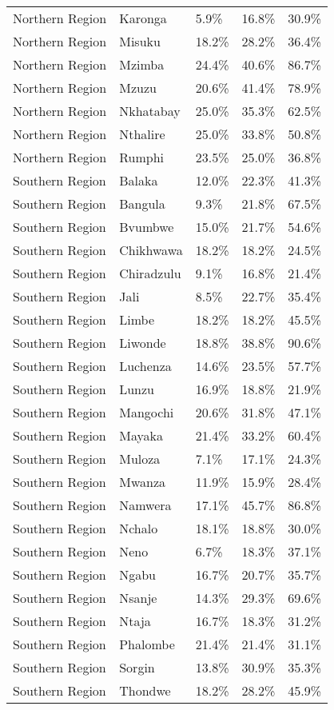 \begin{table}[ht]
\begin{tabular}{lllll}
  Northern Region & Karonga & 5.9\% & 16.8\% & 30.9\% \\ 
  Northern Region & Misuku & 18.2\% & 28.2\% & 36.4\% \\ 
  Northern Region & Mzimba & 24.4\% & 40.6\% & 86.7\% \\ 
  Northern Region & Mzuzu & 20.6\% & 41.4\% & 78.9\% \\ 
  Northern Region & Nkhatabay & 25.0\% & 35.3\% & 62.5\% \\ 
  Northern Region & Nthalire & 25.0\% & 33.8\% & 50.8\% \\ 
  Northern Region & Rumphi & 23.5\% & 25.0\% & 36.8\% \\ 
  Southern Region & Balaka & 12.0\% & 22.3\% & 41.3\% \\ 
  Southern Region & Bangula & 9.3\% & 21.8\% & 67.5\% \\ 
  Southern Region & Bvumbwe & 15.0\% & 21.7\% & 54.6\% \\ 
  Southern Region & Chikhwawa & 18.2\% & 18.2\% & 24.5\% \\ 
  Southern Region & Chiradzulu & 9.1\% & 16.8\% & 21.4\% \\ 
  Southern Region & Jali & 8.5\% & 22.7\% & 35.4\% \\ 
  Southern Region & Limbe & 18.2\% & 18.2\% & 45.5\% \\ 
  Southern Region & Liwonde & 18.8\% & 38.8\% & 90.6\% \\ 
  Southern Region & Luchenza & 14.6\% & 23.5\% & 57.7\% \\ 
  Southern Region & Lunzu & 16.9\% & 18.8\% & 21.9\% \\ 
  Southern Region & Mangochi & 20.6\% & 31.8\% & 47.1\% \\ 
  Southern Region & Mayaka & 21.4\% & 33.2\% & 60.4\% \\ 
  Southern Region & Muloza & 7.1\% & 17.1\% & 24.3\% \\ 
  Southern Region & Mwanza & 11.9\% & 15.9\% & 28.4\% \\ 
  Southern Region & Namwera & 17.1\% & 45.7\% & 86.8\% \\ 
  Southern Region & Nchalo & 18.1\% & 18.8\% & 30.0\% \\ 
  Southern Region & Neno & 6.7\% & 18.3\% & 37.1\% \\ 
  Southern Region & Ngabu & 16.7\% & 20.7\% & 35.7\% \\ 
  Southern Region & Nsanje & 14.3\% & 29.3\% & 69.6\% \\ 
  Southern Region & Ntaja & 16.7\% & 18.3\% & 31.2\% \\ 
  Southern Region & Phalombe & 21.4\% & 21.4\% & 31.1\% \\ 
  Southern Region & Sorgin & 13.8\% & 30.9\% & 35.3\% \\ 
  Southern Region & Thondwe & 18.2\% & 28.2\% & 45.9\% \\ 
   \hline
\end{tabular}
\end{table}
